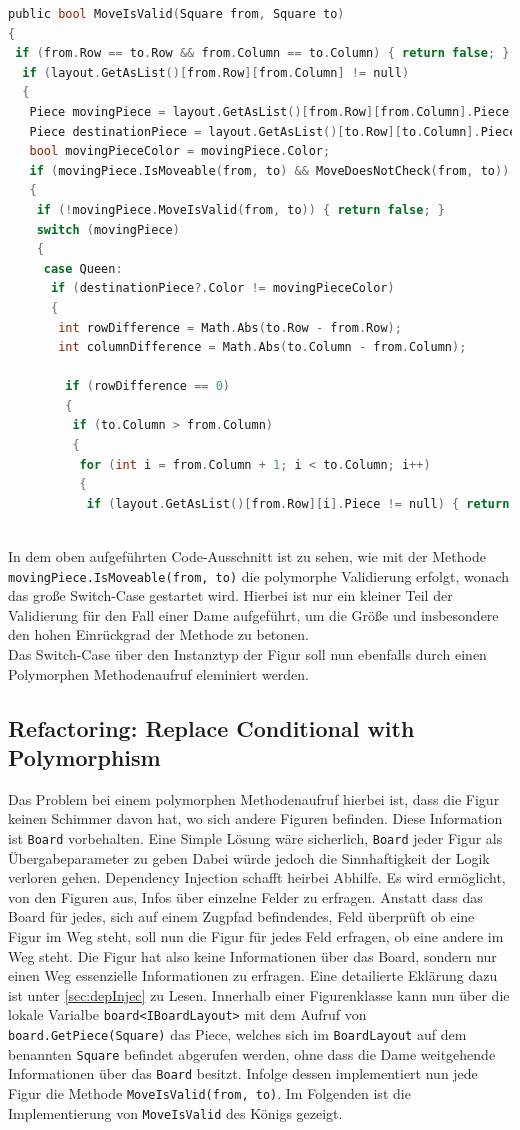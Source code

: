 \documentclass[
10pt, %
a4paper, %
oneside, %
headinclude,footinclude, %
BCOR5mm, %
]{scrartcl}
\begin{document}
\begin{onehalfspace}
\begin{lstlisting}[language=c, style=mStyle]
public bool MoveIsValid(Square from, Square to)
{
 if (from.Row == to.Row && from.Column == to.Column) { return false; }
  if (layout.GetAsList()[from.Row][from.Column] != null)
  {
   Piece movingPiece = layout.GetAsList()[from.Row][from.Column].Piece;
   Piece destinationPiece = layout.GetAsList()[to.Row][to.Column].Piece;
   bool movingPieceColor = movingPiece.Color;
   if (movingPiece.IsMoveable(from, to) && MoveDoesNotCheck(from, to))
   {
	if (!movingPiece.MoveIsValid(from, to)) { return false; }
	switch (movingPiece)
	{
	 case Queen:
	  if (destinationPiece?.Color != movingPieceColor)
	  {
	   int rowDifference = Math.Abs(to.Row - from.Row);
	   int columnDifference = Math.Abs(to.Column - from.Column);

	    if (rowDifference == 0)
		{
		 if (to.Column > from.Column)
		 {
		  for (int i = from.Column + 1; i < to.Column; i++)
		  {
		   if (layout.GetAsList()[from.Row][i].Piece != null) { return false; }
		  
\end{lstlisting}
In dem oben aufgeführten Code-Ausschnitt ist zu sehen, wie mit der Methode \texttt{movingPiece.IsMoveable(from, to)} die polymorphe Validierung erfolgt, wonach das große Switch-Case gestartet wird. Hierbei ist nur ein kleiner Teil der Validierung für den Fall einer Dame aufgeführt, um die Größe  und insbesondere den hohen Einrückgrad der Methode zu betonen. \\
Das Switch-Case über den Instanztyp der Figur soll nun ebenfalls durch einen Polymorphen Methodenaufruf eleminiert werden. 

\subsection{Refactoring: Replace Conditional with Polymorphism}
Das Problem bei einem polymorphen Methodenaufruf hierbei ist, dass die Figur keinen Schimmer davon hat, wo sich andere Figuren befinden. Diese Information ist \texttt{Board} vorbehalten. Eine Simple Lösung wäre sicherlich, \texttt{Board} jeder Figur als Übergabeparameter zu geben Dabei würde jedoch die Sinnhaftigkeit der Logik verloren gehen. Dependency Injection schafft heirbei Abhilfe. Es wird ermöglicht, von den Figuren aus, Infos über einzelne Felder zu erfragen. Anstatt dass das Board für jedes, sich auf einem Zugpfad befindendes, Feld überprüft ob eine Figur im Weg steht, soll nun die Figur für jedes Feld erfragen, ob eine andere im Weg steht. Die Figur hat also keine Informationen über das Board, sondern nur einen Weg essenzielle Informationen zu erfragen. Eine detailierte Eklärung dazu ist unter \autoref{sec:depInjec} zu Lesen. Innerhalb einer Figurenklasse kann nun über die lokale Varialbe \texttt{board<IBoardLayout>} mit dem Aufruf von  \texttt{board.GetPiece(Square)} das Piece, welches sich im \texttt{BoardLayout} auf dem benannten \texttt{Square} befindet abgerufen werden, ohne dass die Dame weitgehende Informationen über das \texttt{Board} besitzt.
Infolge dessen implementiert nun jede Figur die Methode \texttt{MoveIsValid(from, to)}. Im Folgenden ist die Implementierung von \texttt{MoveIsValid} des Königs gezeigt.


\end{onehalfspace}
\end{document}

